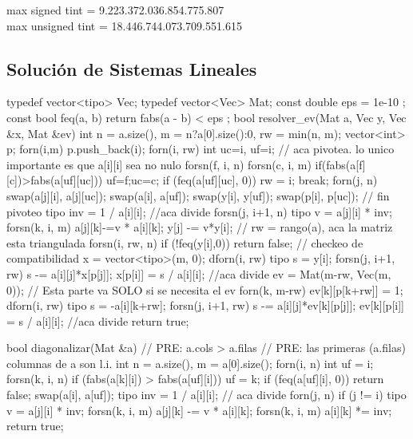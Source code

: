 \documentclass[10pt,landscape,twocolumn,a4paper,notitlepage]{article}
\begin{document}
max signed tint = 9.223.372.036.854.775.807 \\
max unsigned tint = 18.446.744.073.709.551.615
%
%
\subsection{Soluci\'on de Sistemas Lineales}
\begin{code}
typedef vector<tipo> Vec;
typedef vector<Vec> Mat;
const double eps = 1e-10 ;
const bool feq(a, b) { return fabs(a - b) < eps ; }
bool resolver_ev(Mat a, Vec y, Vec &x, Mat &ev){
  int n = a.size(), m = n?a[0].size():0, rw = min(n, m);
  vector<int> p; forn(i,m) p.push_back(i);
  forn(i, rw){
    int uc=i, uf=i;
    // aca pivotea. lo unico importante es que a[i][i] sea no nulo
    forsn(f, i, n) forsn(c, i, m) if(fabs(a[f][c])>fabs(a[uf][uc])) {uf=f;uc=c;}
    if (feq(a[uf][uc], 0)) { rw = i; break; }
    forn(j, n) swap(a[j][i], a[j][uc]);
    swap(a[i], a[uf]); swap(y[i], y[uf]); swap(p[i], p[uc]);
    // fin pivoteo
    tipo inv = 1 / a[i][i]; //aca divide
    forsn(j, i+1, n) {
      tipo v = a[j][i] * inv;
      forsn(k, i, m) a[j][k]-=v * a[i][k];
      y[j] -= v*y[i];
    }
  } // rw = rango(a), aca la matriz esta triangulada
  forsn(i, rw, n) if (!feq(y[i],0)) return false; // checkeo de compatibilidad
  x = vector<tipo>(m, 0);
  dforn(i, rw){
    tipo s = y[i];
    forsn(j, i+1, rw) s -= a[i][j]*x[p[j]];
    x[p[i]] = s / a[i][i]; //aca divide
  }
  ev = Mat(m-rw, Vec(m, 0)); // Esta parte va SOLO si se necesita el ev
  forn(k, m-rw) {
    ev[k][p[k+rw]] = 1;
    dforn(i, rw){
      tipo s = -a[i][k+rw];
      forsn(j, i+1, rw) s -= a[i][j]*ev[k][p[j]];
      ev[k][p[i]] = s / a[i][i]; //aca divide
    }
  }
  return true;
}

bool diagonalizar(Mat &a){
	// PRE: a.cols > a.filas
	// PRE: las primeras (a.filas) columnas de a son l.i.
  int n = a.size(), m = a[0].size();
  forn(i, n){
		int uf = i;
		forsn(k, i, n) if (fabs(a[k][i]) > fabs(a[uf][i])) uf = k;
		if (feq(a[uf][i], 0)) return false;
		swap(a[i], a[uf]);
    tipo inv = 1 / a[i][i]; // aca divide
    forn(j, n) if (j != i) {
      tipo v = a[j][i] * inv;
      forsn(k, i, m) a[j][k] -= v * a[i][k];
		}
    forsn(k, i, m) a[i][k] *= inv;
  }
	return true;
}
\end{code}
\end{document}
